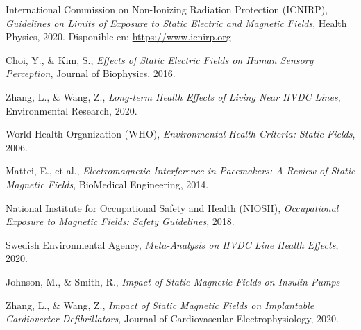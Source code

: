 \newpage
\begin{thebibliography}{9}

International Commission on Non-Ionizing Radiation Protection (ICNIRP), \textit{Guidelines on Limits of Exposure to Static Electric and Magnetic Fields}, Health Physics, 2020. Disponible en: \url{https://www.icnirp.org}

Choi, Y., \& Kim, S., \textit{Effects of Static Electric Fields on Human Sensory Perception}, Journal of Biophysics, 2016.

Zhang, L., \& Wang, Z., \textit{Long-term Health Effects of Living Near HVDC Lines}, Environmental Research, 2020.

World Health Organization (WHO), \textit{Environmental Health Criteria: Static Fields}, 2006.

Mattei, E., et al., \textit{Electromagnetic Interference in Pacemakers: A Review of Static Magnetic Fields}, BioMedical Engineering, 2014.

National Institute for Occupational Safety and Health (NIOSH), \textit{Occupational Exposure to Magnetic Fields: Safety Guidelines}, 2018.

Swedish Environmental Agency, \textit{Meta-Analysis on HVDC Line Health Effects}, 2020.

Johnson, M., \& Smith, R., \textit{Impact of Static Magnetic Fields on Insulin Pumps}

Zhang, L., \& Wang, Z., \textit{Impact of Static Magnetic Fields on Implantable Cardioverter Defibrillators}, Journal of Cardiovascular Electrophysiology, 2020.
\end{thebibliography}
